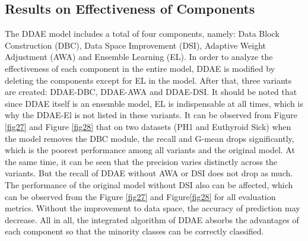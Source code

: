 \subsection{Results on Effectiveness of Components}
The DDAE model includes a total of four components, namely: Data Block Construction (DBC), Data Space Improvement (DSI), Adaptive Weight Adjustment (AWA) and Ensemble Learning (EL). In order to analyze the effectiveness of each component in the entire model, DDAE is modified by deleting the components except for EL in the model. After that, three variants are created: DDAE-DBC, DDAE-AWA and DDAE-DSI. It should be noted that since DDAE itself is an ensemble model, EL is indispensable at all times, which is why the DDAE-El is not listed in these variants. It can be observed from Figure \ref{fig27} and Figure \ref{fig28} that on two datasets (PH1 and Euthyroid Sick) when the model removes the DBC module, the recall and G-mean drops significantly, which is the poorest performance among all variants and the original model. At the same time, it can be seen that the precision varies distinctly across the variants. But the recall of DDAE without AWA or DSI does not drop as much. The performance of the original model without DSI also can be affected, which can be observed from the Figure \ref{fig27} and Figure\ref{fig28} for all evaluation metrics. Without the improvement to data space, the accuracy of prediction may decrease. All in all, the integrated algorithm of DDAE absorbs the advantages of each component so that the minority classes can be correctly classified.
